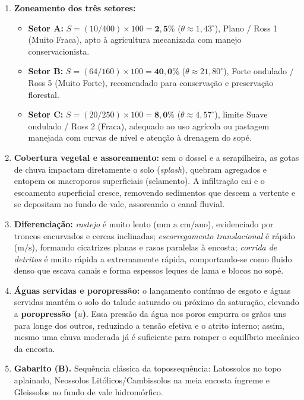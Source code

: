 \begin{boxGabarito}
\begin{enumerate}[leftmargin=1.8em, itemsep=3.5pt]
  \item \textbf{Zoneamento dos três setores:}
  \begin{itemize}[leftmargin=1.4em, itemsep=1pt]
    \item \textbf{Setor A:} $S = (10 / 400)\times 100 = \mathbf{2{,}5\%}$ ($\theta \approx 1{,}43^\circ$), Plano / Ross 1 (Muito Fraca), apto à agricultura mecanizada com manejo conservacionista.
    \item \textbf{Setor B:} $S = (64 / 160)\times 100 = \mathbf{40{,}0\%}$ ($\theta \approx 21{,}80^\circ$), Forte ondulado / Ross 5 (Muito Forte), recomendado para conservação e preservação florestal.
    \item \textbf{Setor C:} $S = (20 / 250)\times 100 = \mathbf{8{,}0\%}$ ($\theta \approx 4{,}57^\circ$), limite Suave ondulado / Ross 2 (Fraca), adequado ao uso agrícola ou pastagem manejada com curvas de nível e atenção à drenagem do sopé.
  \end{itemize}

  \item \textbf{Cobertura vegetal e assoreamento:} sem o dossel e a serapilheira, as gotas de chuva impactam diretamente o solo (\textit{splash}), quebram agregados e entopem os macroporos superficiais (selamento). A infiltração cai e o escoamento superficial cresce, removendo sedimentos que descem a vertente e se depositam no fundo de vale, assoreando o canal fluvial.

  \item \textbf{Diferenciação:} \textit{rastejo} é muito lento ($\text{mm a cm/ano}$), evidenciado por troncos encurvados e cercas inclinadas; \textit{escorregamento translacional} é rápido ($\text{m/s}$), formando cicatrizes planas e rasas paralelas à encosta; \textit{corrida de detritos} é muito rápida a extremamente rápida, comportando-se como fluido denso que escava canais e forma espessos leques de lama e blocos no sopé.

  \item \textbf{Águas servidas e poropressão:} o lançamento contínuo de esgoto e águas servidas mantém o solo do talude saturado ou próximo da saturação, elevando a \textbf{poropressão ($u$)}. Essa pressão da água nos poros empurra os grãos uns para longe dos outros, reduzindo a tensão efetiva e o atrito interno; assim, mesmo uma chuva moderada já é suficiente para romper o equilíbrio mecânico da encosta.

  \item \textbf{Gabarito (B).} Sequência clássica da topossequência: Latossolos no topo aplainado, Neossolos Litólicos/Cambissolos na meia encosta íngreme e Gleissolos no fundo de vale hidromórfico.


\end{enumerate}
\end{boxGabarito}
